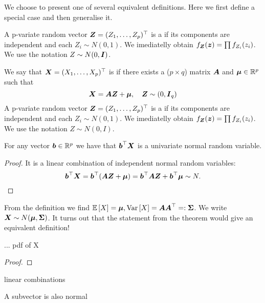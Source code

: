We choose to present one of several equivalent definitions. Here we first define a special case and then generalise it. 
\begin{definition}
    A p-variate random vector $\boldsymbol{Z}=(Z_1, \dots, Z_p)^\top$ is a  if its components are independent and each $Z_i\sim N(0,1)$. We imediatelly obtain $f_{\boldsymbol{Z}}(\boldsymbol{z}) = \prod f_{Z_i} (z_i)$. We use the notation $Z\sim N(0, \boldsymbol{I})$.
\end{definition}
\begin{definition}
    We say that $\boldsymbol{X} = (X_1,\dots, X_p)^\top$ is  if there exists a ($p\times q$) matrix $\boldsymbol{A}$ and $\boldsymbol{\mu}\in\mathbb{R}^p$ such that 
    $$
        \boldsymbol{X} = \boldsymbol{A} \boldsymbol{Z} + \boldsymbol{\mu}, \quad \boldsymbol{Z} \sim (0, \boldsymbol{I}_q)
    $$
    A p-variate random vector $\boldsymbol{Z}=(Z_1, \dots, Z_p)^\top$ is a  if its components are independent and each $Z_i\sim N(0,1)$. We imediatelly obtain $f_{\boldsymbol{Z}}(\boldsymbol{z}) = \prod f_{Z_i} (z_i)$. We use the notation $Z\sim N(0, I)$.
\end{definition}
\begin{theorem}
    For any vector $\boldsymbol{b}\in\mathbb{R}^p$ we have that $\boldsymbol{b}^\top \boldsymbol{X}$ is a univariate normal random variable.
\end{theorem}
\begin{proof}
    It is a linear combination of independent normal random variables:
    $$
        \boldsymbol{b}^\top \boldsymbol{X} = \boldsymbol{b}^\top(\boldsymbol{A}\boldsymbol{Z} + \boldsymbol{\mu}) = \boldsymbol{b}^\top \boldsymbol{A} \boldsymbol{Z} + \boldsymbol{b}^\top\boldsymbol{\mu} \sim N. 
    $$
\end{proof}
From the definition we find $\mathbb{E}\left[X\right] = \boldsymbol{\mu}, \mathrm{Var}\left[X\right] = \boldsymbol{A}\boldsymbol{A}^\top =: \boldsymbol{\Sigma}$. We write $\boldsymbol{X} \sim N(\boldsymbol{\mu}, \boldsymbol{\Sigma})$. It turns out that the statement from the theorem would give an equivalent definition!
\begin{theorem}
    ... pdf of X\TODO{}    
\end{theorem}
\begin{proof}
    \TODO{}
\end{proof}
 
\begin{theorem}
    linear combinations\TODO{}
\end{theorem}

\begin{corollary}
\end{corollary}

\begin{corollary}
    A subvector is also normal \TODO{}
\end{corollary}

